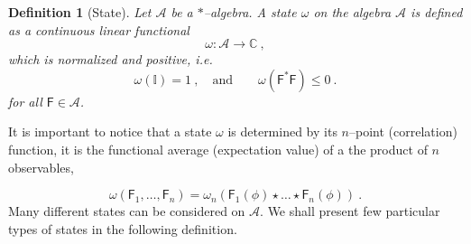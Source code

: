 \documentclass[11pt]{book}
\newcommand{\Acal}{\mathcal{A}}
\newcommand{\Cbb}{\mathbb{C}}
\newcommand{\Ibb}{\mathbb{I}}
\newcommand{\Fsf}{\mathsf{F}}
\theoremstyle{break}
\newtheorem{definition}{Definition}[chapter]
\begin{document}
\begin{definition}[State]
Let $\Acal$ be a $\ast$--algebra. A state $\omega$ on the algebra $\Acal$ is defined as a continuous linear functional
%
\begin{equation*}
\omega : \Acal \to \Cbb \ , 
\end{equation*}
%
which is normalized and positive, i.e.
%
\begin{equation*}
\omega(\Ibb) =  1 \ , \quad \mbox{and} \qquad \omega(\Fsf^\ast \Fsf) \leq 0 \ . 
\end{equation*}
%
for all $\Fsf \in \Acal$.
\end{definition}


It is important to notice that a state $\omega$ is determined by its $n$--point (correlation) function, it is the functional average (expectation value) of a the product of $n$ observables,

%
\begin{equation*}
\omega( \Fsf_1 , \dots , \Fsf_n ) =  \omega_n\left( \Fsf_1(\phi) \star \dots \star \Fsf_n(\phi) \right) \ . 
\end{equation*}
%
Many different states can be considered on $\Acal$. We shall present few particular types of states in the following definition.
\end{document}
